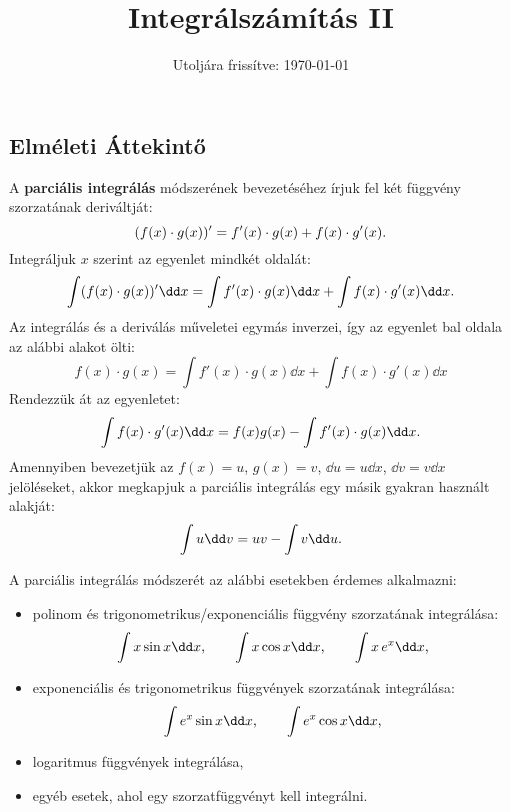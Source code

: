 \documentclass[a4paper, 12pt]{scrartcl}
\title{Integrálszámítás II}
\date{Utoljára frissítve: \today}
\begin{document}
\maketitle

\subsection{Elméleti Áttekintő}

\begin{blueBox}
  A \textbf{parciális integrálás} módszerének bevezetéséhez írjuk fel két
  függvény szorzatának deriváltját:
  \[
    (f(x) \cdot g(x))' = f'(x) \cdot g(x) + f(x) \cdot g'(x)
    \text.
  \]
  Integráljuk $x$ szerint az egyenlet mindkét oldalát:
  \[
    \int (f(x) \cdot g(x))' \dd x = \int f'(x) \cdot g(x) \dd x +
    \int f(x) \cdot g'(x) \dd x
    \text.
  \]
  Az integrálás és a deriválás műveletei egymás inverzei, így az egyenlet bal
  oldala az alábbi alakot ölti:
  \[
    f(x) \cdot g(x) = \int f'(x) \cdot g(x) \dd x + \int f(x) \cdot g'(x) \dd x
  \]
  Rendezzük át az egyenletet:
  \[
    \int f(x) \cdot g'(x) \dd x = f(x) g(x) - \int f'(x) \cdot g(x) \dd x
    \text.
  \]
  Amennyiben bevezetjük az $f(x) = u$, $g(x) = v$, $\dd u = u \dd x$, $\dd v = v
    \dd x$ jelöléseket, akkor megkapjuk a parciális integrálás egy másik gyakran
  használt alakját:
  \[
    \int u \dd v = u v - \int v \dd u
    \text.
  \]
\end{blueBox}

\begin{note}
  A parciális integrálás módszerét az alábbi esetekben érdemes alkalmazni:
  \begin{itemize}
    \item polinom és trigonometrikus/exponenciális függvény szorzatának
          integrálása:
          \[
            \int x \sin x \dd x
            \text,\qquad
            \int x \cos x \dd x
            \text,\qquad
            \int x \, e^x \dd x
            \text,
          \]
    \item exponenciális és trigonometrikus függvények szorzatának integrálása:
          \[
            \int e^x \sin x \dd x
            \text,\qquad
            \int e^x \cos x \dd x
            \text,
          \]
    \item logaritmus függvények integrálása,
    \item egyéb esetek, ahol egy szorzatfüggvényt kell integrálni.
  \end{itemize}
\end{note}
\end{document}
